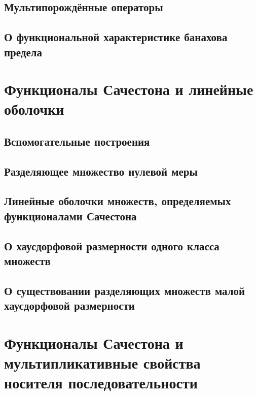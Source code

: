 \documentclass[12pt,a4paper,openbib]{report}
\theoremstyle{definition}
\begin{document}
	\section{Мультипорождённые операторы}
	

	\section{О функциональной характеристике банахова предела}
	


\chapter{Функционалы Сачестона и линейные оболочки}

	

	\section{Вспомогательные построения}
	

	\section{Разделяющее множество нулевой меры}
	

	\section{Линейные оболочки множеств, определяемых функционалами Сачестона}
	

	\section{О хаусдорфовой размерности одного класса множеств}
	

	\section{О существовании разделяющих множеств малой хаусдорфовой размерности}
	


\chapter{Функционалы Сачестона и мультипликативные свойства носителя последовательности}
\end{document}
